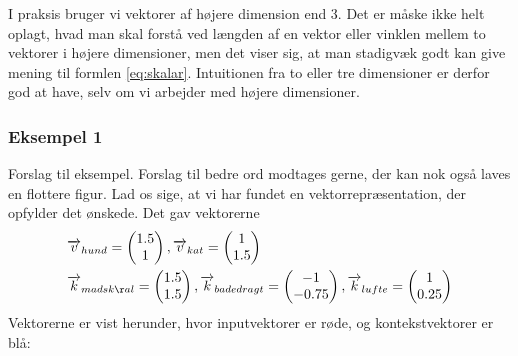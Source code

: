 \documentclass{article}
\newcommand{\am}[1]{{\color{red} #1}}
\begin{document}
I praksis bruger vi vektorer af højere dimension end 3. Det er måske ikke helt oplagt, hvad man skal forstå ved længden af en vektor eller vinklen mellem to vektorer i højere dimensioner, men det viser sig, at man stadigvæk godt kan give mening til formlen \eqref{eq:skalar}. Intuitionen fra to eller tre dimensioner er derfor god at have, selv om vi arbejder med højere dimensioner.

\subsubsection*{Eksempel 1}\am{Forslag til eksempel. Forslag til bedre ord modtages gerne, der kan nok også laves en flottere figur. }
Lad os sige, at vi har fundet en vektorrepræsentation, der opfylder det ønskede. Det gav vektorerne
\begin{align*}
&\overrightarrow{v}_{hund} =  \begin{pmatrix} 1.5\\ 1\end{pmatrix}, \overrightarrow{v}_{kat} =  \begin{pmatrix} 1\\ 1.5\end{pmatrix} \\
&\overrightarrow{k}_{madsk\aa l}  =  \begin{pmatrix} 1.5\\1.5\end{pmatrix}, \overrightarrow{k}_{badedragt} =  \begin{pmatrix} -1\\-0.75 \end{pmatrix}, \overrightarrow{k}_{lufte} =  \begin{pmatrix} 1\\0.25 \end{pmatrix} \end{align*}
Vektorerne er vist herunder, hvor inputvektorer er røde, og kontekstvektorer er blå:

\begin{center}
\end{center}
\end{document}
